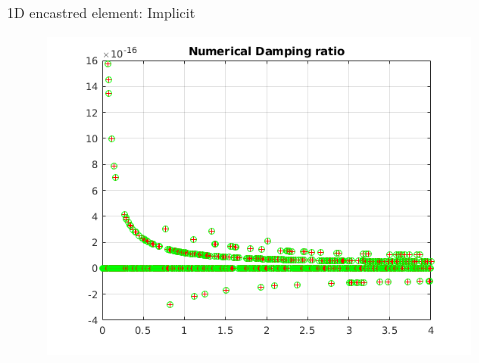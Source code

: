 \begin{frame}{1D encastred element: Implicit}
\begin{figure}[ht]
\begin{minipage}[b]{0.5\linewidth}
  \end{minipage}%
  \begin{minipage}[b]{0.5\linewidth}
    \centering
    \includegraphics[scale=.35]{images/enc-imp-4.png} \\

  \end{minipage} 
\end{figure}
\end{frame}

